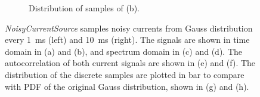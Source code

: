 \begin{figure}[tbp!]
\begin{subfigure}[t]{0.43\textwidth}
			\caption{Distribution of samples of (b).}
		\end{subfigure}
		\caption{\textit{NoisyCurrentSource} samples noisy currents from \DIFaddbeginFL {}\DIFaddendFL Gauss distribution \DIFdelbeginFL {}\DIFdelendFL every 1~ms (left) and 10~ms (right). The signals are shown in \DIFaddbeginFL {}\DIFaddendFL time domain in (a) and (b), and \DIFaddbeginFL {}\DIFaddendFL spectrum domain in (c) and (d). The autocorrelation of both current signals are shown in (e) and (f). The distribution of the discrete samples are plotted in bar \DIFdelbeginFL {}\DIFdelendFL \DIFaddbeginFL {}\DIFaddendFL to compare with \DIFaddbeginFL {}\DIFaddendFL PDF of the original Gauss distribution, shown in (g) and (h).}
		\label{Fig:lif_curr}
	\end{figure}


